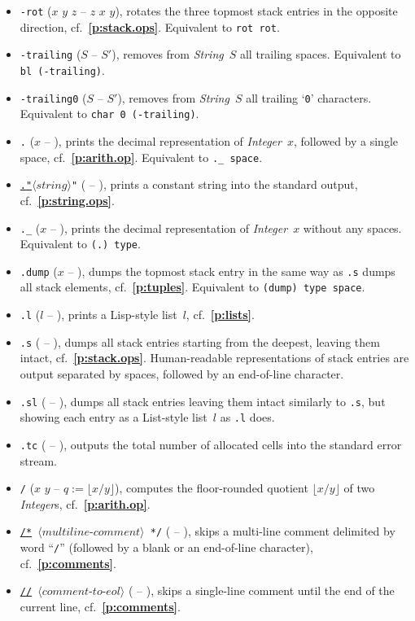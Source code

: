 \documentclass[12pt,oneside]{article}
\def\refpoint#1{{\rm\textbf{\ref{#1}}}}
\let\ptref=\refpoint
\begin{document}
\begin{itemize}
\item {\tt -rot} ($x$ $y$ $z$ -- $z$ $x$ $y$), rotates the three topmost stack entries in the opposite direction, cf.~\ptref{p:stack.ops}. Equivalent to {\tt rot rot}.
\item {\tt -trailing} ($S$ -- $S'$), removes from {\em String\/}~$S$ all trailing spaces. Equivalent to {\tt bl (-trailing)}.
\item {\tt -trailing0} ($S$ -- $S'$), removes from {\em String\/}~$S$ all trailing `{\tt 0}' characters. Equivalent to {\tt char 0 (-trailing)}.
\item {\tt .} ($x$ -- ), prints the decimal representation of {\em Integer\/}~$x$, followed by a single space, cf.~\ptref{p:arith.op}. Equivalent to {\tt .\_ space}.
\item {\tt\underline{."}$\langle\textit{string}\rangle$"} ( -- ), prints a constant string into the standard output, cf.~\ptref{p:string.ops}.
\item {\tt .\_} ($x$ -- ), prints the decimal representation of {\em Integer\/}~$x$ without any spaces. Equivalent to {\tt (.)~type}.
\item {\tt .dump} ($x$ -- ), dumps the topmost stack entry in the same way as {\tt .s} dumps all stack elements, cf.~\ptref{p:tuples}. Equivalent to {\tt (dump) type space}.
\item {\tt .l} ($l$ -- ), prints a Lisp-style list~$l$, cf.~\ptref{p:lists}.
\item {\tt .s} ( -- ), dumps all stack entries starting from the deepest, leaving them intact, cf.~\ptref{p:stack.ops}. Human-readable representations of stack entries are output separated by spaces, followed by an end-of-line character.
\item {\tt .sl} ( -- ), dumps all stack entries leaving them intact similarly to {\tt .s}, but showing each entry as a List-style list~$l$ as {\tt .l} does.
\item {\tt .tc} ( -- ), outputs the total number of allocated cells into the standard error stream.
\item {\tt /} ($x$ $y$ -- $q:=\lfloor x/y\rfloor$), computes the floor-rounded quotient $\lfloor x/y\rfloor$ of two {\em Integer\/}s, cf.~\ptref{p:arith.op}.
\item {\tt \underline{/*} $\langle\textit{multiline-comment}\rangle$ */} ( -- ), skips a multi-line comment delimited by word ``{\tt */}'' (followed by a blank or an end-of-line character), cf.~\ptref{p:comments}.
\item {\tt \underline{//} $\langle\textit{comment-to-eol}\rangle$} ( -- ), skips a single-line comment until the end of the current line, cf.~\ptref{p:comments}.

\end{itemize}
\end{document}
